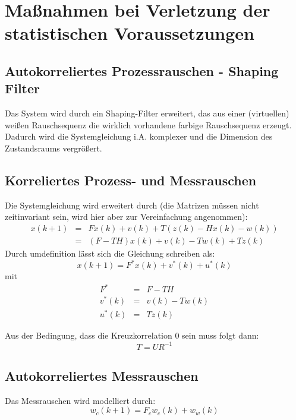 \section{Maßnahmen bei Verletzung der statistischen Voraussetzungen}
\subsection{Autokorreliertes Prozessrauschen - Shaping Filter}
Das System wird durch ein Shaping-Filter erweitert, das aus einer (virtuellen) weißen Rauschsequenz die wirklich
vorhandene farbige Rauschsequenz erzeugt. Dadurch wird die Systemgleichung i.A. komplexer und die Dimension des
Zustandsraums vergrößert.

\subsection{Korreliertes Prozess- und Messrauschen}
Die Systemgleichung wird erweitert durch (die Matrizen müssen nicht zeitinvariant sein, wird hier aber zur Vereinfachung
angenommen):
\begin{eqnarray*}
    x(k+1) &=& Fx(k) + v(k) + T \left( z(k) - H x(k) - w(k)\right) \\
        &=& (F-TH) x(k) + v(k) - T w(k) + T z(k)
\end{eqnarray*}
Durch umdefinition lässt sich die Gleichung schreiben als:
\begin{equation*}
    x(k+1) = F^* x(k) + v^*(k) + u^*(k)
\end{equation*}
mit
\begin{eqnarray*}
    F^* &=& F - TH \\
    v^*(k) &=& v(k) - Tw(k) \\
    u^*(k) &=& Tz(k)
\end{eqnarray*}

Aus der Bedingung, dass die Kreuzkorrelation $0$ sein muss folgt dann:
\begin{equation*}
    T = U R^{-1}
\end{equation*}

\subsection{Autokorreliertes Messrauschen}
Das Messrauschen wird modelliert durch:
\begin{equation*}
    w_c(k+1) = F_c w_c(k) + w_w(k)
\end{equation*}

